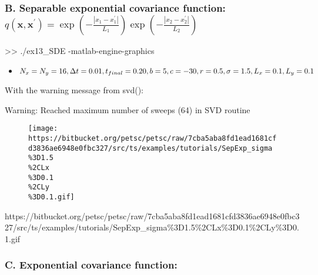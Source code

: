 \documentclass[
]{article}
\newenvironment{Shaded}{}{}
\newcommand{\NormalTok}[1]{#1}
\begin{document}
\hypertarget{header-n414}{%
\subsubsection{\texorpdfstring{B. Separable exponential covariance
function:
\(q(\mathbf{x},\mathbf{x}^{\prime})=\exp\left(-\frac{|x_1-x^{\prime}_1|}{L_1}\right) \exp\left(-\frac{|x_2-x^{\prime}_2|}{L_2}\right)\)}{B. Separable exponential covariance function: q(\textbackslash mathbf\{x\},\textbackslash mathbf\{x\}\^{}\{\textbackslash prime\})=\textbackslash exp\textbackslash left(-\textbackslash frac\{\textbar x\_1-x\^{}\{\textbackslash prime\}\_1\textbar\}\{L\_1\}\textbackslash right) \textbackslash exp\textbackslash left(-\textbackslash frac\{\textbar x\_2-x\^{}\{\textbackslash prime\}\_2\textbar\}\{L\_2\}\textbackslash right)}}\label{header-n414}}

\begin{Shaded}
\begin{Highlighting}[]
\NormalTok{>> ./ex13_SDE -matlab-engine-graphics}
\end{Highlighting}
\end{Shaded}

\begin{itemize}
\item
  \(N_x=N_y=16, \Delta t=0.01, t_{final}=0.20,\\b=5,c=-30,r=0.5,\\\sigma=1.5,L_{x}=0.1,L_{y}=0.1\)
\end{itemize}

With the warning message from svd():

Warning: Reached maximum number of sweeps (64) in SVD routine

\begin{figure}
\centering
\texttt{[image: https://bitbucket.org/petsc/petsc/raw/7cba5aba8fd1ead1681cfd3836ae6948e0fbc327/src/ts/examples/tutorials/SepExp\_sigma\\\%3D1.5\\\%2CLx\\\%3D0.1\\\%2CLy\\\%3D0.1.gif]}
\caption{}
\end{figure}

https://bitbucket.org/petsc/petsc/raw/7cba5aba8fd1ead1681cfd3836ae6948e0fbc327/src/ts/examples/tutorials/SepExp\_sigma\%3D1.5\%2CLx\%3D0.1\%2CLy\%3D0.1.gif

\hypertarget{header-n1068}{%
\subsubsection{C. Exponential covariance function:}\label{header-n1068}}
\end{document}
